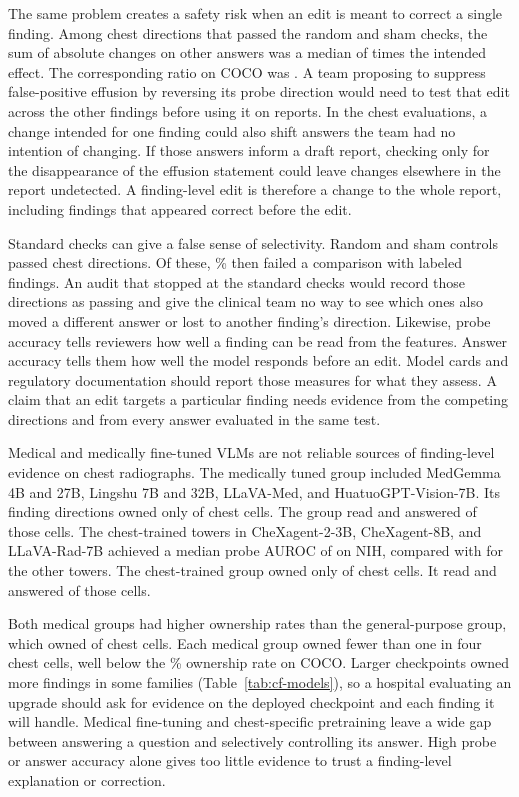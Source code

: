 The same problem creates a safety risk when an edit is meant to correct a single finding. Among chest directions that passed the random and sham checks, the sum of absolute changes on other answers was a median of \jnOffTargetChest{} times the intended effect. The corresponding ratio on COCO was \jnOffTargetCoco{}. A team proposing to suppress false-positive effusion by reversing its probe direction would need to test that edit across the other findings before using it on reports. In the chest evaluations, a change intended for one finding could also shift answers the team had no intention of changing. If those answers inform a draft report, checking only for the disappearance of the effusion statement could leave changes elsewhere in the report undetected. A finding-level edit is therefore a change to the whole report, including findings that appeared correct before the edit.

Standard checks can give a false sense of selectivity. Random and sham controls passed \jnRefChest{} chest directions. Of these, \jnRefNotTwoWayChestPct{}\% then failed a comparison with labeled findings. An audit that stopped at the standard checks would record those directions as passing and give the clinical team no way to see which ones also moved a different answer or lost to another finding's direction. Likewise, probe accuracy tells reviewers how well a finding can be read from the features. Answer accuracy tells them how well the model responds before an edit. Model cards and regulatory documentation should report those measures for what they assess. A claim that an edit targets a particular finding needs evidence from the competing directions and from every answer evaluated in the same test.

Medical and medically fine-tuned VLMs are not reliable sources of finding-level evidence on chest radiographs. The medically tuned group included MedGemma 4B and 27B, Lingshu 7B and 32B, LLaVA-Med, and HuatuoGPT-Vision-7B. Its finding directions owned only \cfSpecMedOwned{} of \cfSpecMedN{} chest cells. The group read \cfSpecMedReadable{} and answered \cfSpecMedAnswerable{} of those cells. The chest-trained towers in CheXagent-2-3B, CheXagent-8B, and LLaVA-Rad-7B achieved a median probe AUROC of \cfSpecTowerProbeAuroc{} on NIH, compared with \cfSpecRestProbeAuroc{} for the other towers. The chest-trained group owned only \cfSpecTowerOwned{} of \cfSpecTowerN{} chest cells. It read \cfSpecTowerReadable{} and answered \cfSpecTowerAnswerable{} of those cells.

Both medical groups had higher ownership rates than the general-purpose group, which owned \cfSpecGenOwned{} of \cfSpecGenN{} chest cells. Each medical group owned fewer than one in four chest cells, well below the \cfCocoOwnedPct{}\% ownership rate on COCO. Larger checkpoints owned more findings in some families (Table~\ref{tab:cf-models}), so a hospital evaluating an upgrade should ask for evidence on the deployed checkpoint and each finding it will handle. Medical fine-tuning and chest-specific pretraining leave a wide gap between answering a question and selectively controlling its answer. High probe or answer accuracy alone gives too little evidence to trust a finding-level explanation or correction.


